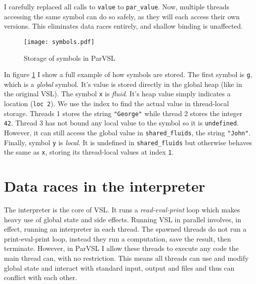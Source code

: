 I carefully replaced all calls to \texttt{value} to \texttt{par\_value}. Now, multiple threads accessing the same symbol
can do so safely, as they will each access their own versions. This eliminates data races entirely,
and shallow binding is unaffected.

\begin{figure}[H]
  \centering
  \texttt{[image: symbols.pdf]}
  \label{fig:symbols}
  \caption{Storage of symbols in ParVSL}
\end{figure}

In figure \ref{fig:symbols} I show a full example of how symbols are stored. The first symbol is \texttt{g}, which
is a \emph{global} symbol. It's value is stored directly in the global heap (like in the original VSL). The symbol \texttt{x}
is \emph{fluid}. It's heap value simply indicates a location (\texttt{loc 2}). We use the index to find the actual value
in thread-local storage. Threads 1 stores the string \texttt{"George"} while thread 2 stores the integer \texttt{42}.
Thread 3 has not bound any local value to the symbol so it is \texttt{undefined}. However, it can still access the
global value in \verb|shared_fluids|, the string \verb|"John"|. Finally, symbol \verb|y| is \emph{local}. It is
undefined in \verb|shared_fluids| but otherwise behaves the same as \verb|x|, storing its thread-local values at
index \verb|1|.

\section{Data races in the interpreter}
\label{sec:datarace}

The interpreter is the core of VSL. It runs a \emph{read-eval-print} loop which makes heavy
use of global state and side effects.
Running VSL in parallel involves, in effect, running an interpreter in each thread. The spawned threads do not
run a print-eval-print loop, instead they run a computation, save the result, then terminate. However,
in ParVSL I allow these threads to execute any code the main thread can, with no restriction. This means
all threads can use and modify global state and interact with standard input, output and files and
thus can conflict with each other.


